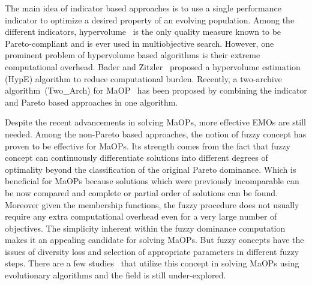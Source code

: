 \documentclass[review]{elsarticle}
\begin{document}
The main idea of indicator based approaches is to use a single performance indicator to optimize a desired property of an evolving population. Among the different indicators, hypervolume~\citep{zitzler1999multiobjective} is the only quality measure known to be Pareto-compliant and is ever used in multiobjective search. However, one prominent problem of hypervolume based algorithms is their extreme computational overhead. Bader and Zitzler~\citep{bader2011hype} proposed a hypervolume estimation (HypE) algorithm  to reduce computational burden. Recently, a two-archive algorithm~(Two\_Arch) for MaOP~\citep{xinyao6883177} has been proposed by combining the indicator and Pareto based approaches in one algorithm.


Despite the recent advancements in solving MaOPs, more effective EMOs are still needed. Among the non-Pareto based approaches, the notion of fuzzy concept has proven to be effective for MaOPs. Its strength comes from the fact that fuzzy concept can continuously differentiate solutions into different degrees of optimality beyond the classification of the original Pareto dominance.
Which is beneficial for MaOPs because solutions which were previously incomparable can be now compared and complete or partial order of solutions can be found. Moreover given the membership functions, the fuzzy procedure does not usually require any extra computational overhead even for a very large number of objectives. The simplicity inherent within the fuzzy dominance computation makes it an appealing candidate for solving MaOPs.
But fuzzy concepts have the issues of diversity loss and selection of appropriate parameters in different fuzzy steps. There are a few studies~\citep{he2014fuzzy,he2012new,koppen2005fuzzy,farina2004fuzzy,fuzzynasir} that utilize this concept in solving MaOPs using evolutionary algorithms and the field is still under-explored.
\end{document}
